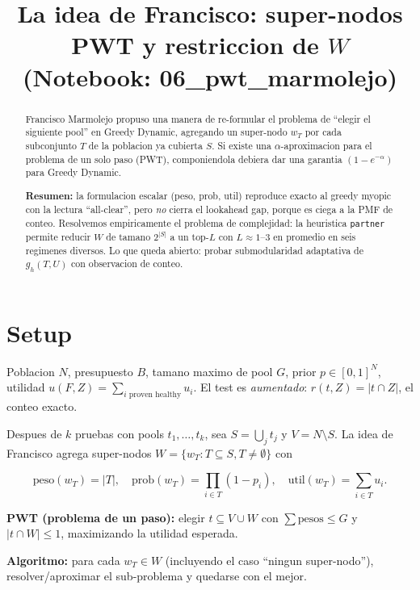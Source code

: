\documentclass[11pt]{article}
\title{La idea de Francisco: super-nodos PWT y restriccion de $W$\\
\large (Notebook: 06\_pwt\_marmolejo)}
\author{}
\date{}
\begin{document}
\maketitle

\begin{abstract}
Francisco Marmolejo propuso una manera de re-formular el problema de
``elegir el siguiente pool'' en Greedy Dynamic, agregando un super-nodo
$w_T$ por cada subconjunto $T$ de la poblacion ya cubierta $S$. Si
existe una $\alpha$-aproximacion para el problema de un solo paso (PWT),
componiendola debiera dar una garantia $(1 - e^{-\alpha})$ para Greedy
Dynamic.

\textbf{Resumen:} la formulacion escalar (peso, prob, util) reproduce
exacto al greedy myopic con la lectura ``all-clear'', pero \emph{no}
cierra el lookahead gap, porque es ciega a la PMF de conteo. Resolvemos
empiricamente el problema de complejidad: la heuristica \texttt{partner}
permite reducir $W$ de tamano $2^{|S|}$ a un top-$L$ con $L \approx 1$--$3$
en promedio en seis regimenes diversos. Lo que queda abierto: probar
submodularidad adaptativa de $g_h(T,U)$ con observacion de conteo.
\end{abstract}

\section{Setup}

Poblacion $N$, presupuesto $B$, tamano maximo de pool $G$, prior
$p \in [0,1]^N$, utilidad $u(F, Z) = \sum_{i \text{ proven healthy}} u_i$.
El test es \emph{aumentado}: $r(t, Z) = |t \cap Z|$, el conteo exacto.

Despues de $k$ pruebas con pools $t_1, \dots, t_k$, sea
$S = \bigcup_{j} t_j$ y $V = N \setminus S$. La idea de Francisco
agrega super-nodos $W = \{w_T : T \subseteq S, T \ne \emptyset\}$ con

\[
\text{peso}(w_T) = |T|, \quad
\text{prob}(w_T) = \prod_{i \in T}(1 - p_i), \quad
\text{util}(w_T) = \sum_{i \in T} u_i.
\]

\textbf{PWT (problema de un paso):} elegir $t \subseteq V \cup W$ con
$\sum \text{pesos} \le G$ y $|t \cap W| \le 1$, maximizando la utilidad
esperada.

\textbf{Algoritmo:} para cada $w_T \in W$ (incluyendo el caso ``ningun
super-nodo''), resolver/aproximar el sub-problema y quedarse con el
mejor.

\end{document}
